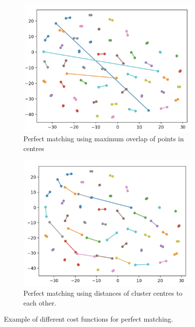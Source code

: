 \documentclass[12pt]{dalthesis}
\begin{document}
\begin{figure}[h]
  \begin{subfigure}[b]{0.5\textwidth}
    \includegraphics[width=\textwidth]{overlap}
    \caption{Perfect matching using maximum overlap of points in centres}
    \label{fig:overlap}
  \end{subfigure}
  \begin{subfigure}[b]{0.5\textwidth}
    \includegraphics[width=\textwidth]{distance}
    \caption{Perfect matching using distances of cluster centres to each other.}
    \label{fig:distance}
  \end{subfigure}
  \caption{Example of different cost functions for perfect matching.}
\end{figure}
\end{document}
